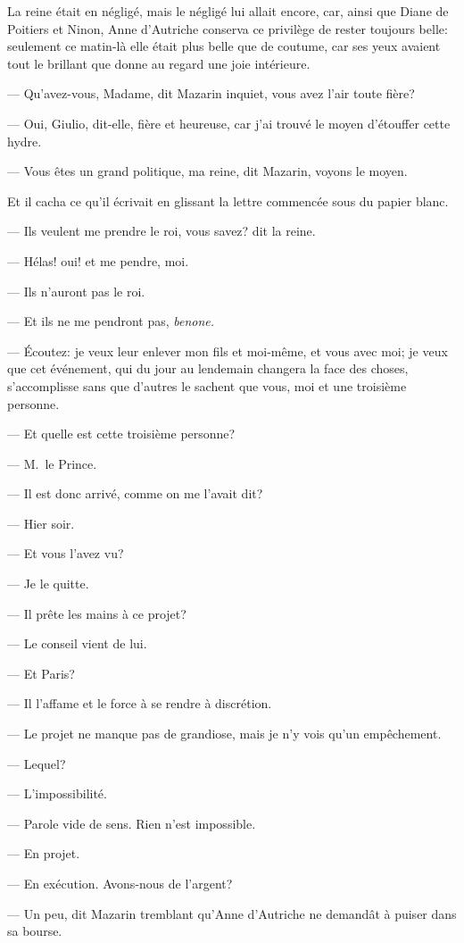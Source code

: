 La reine était en négligé, mais le négligé lui allait encore, car, ainsi que Diane de Poitiers et Ninon, Anne d'Autriche conserva ce privilège de rester toujours belle: seulement ce matin-là elle était plus belle que de coutume, car ses yeux avaient tout le brillant que donne au regard une joie intérieure.

— Qu'avez-vous, Madame, dit Mazarin inquiet, vous avez l'air toute fière?

— Oui, Giulio, dit-elle, fière et heureuse, car j'ai trouvé le moyen d'étouffer cette hydre.

— Vous êtes un grand politique, ma reine, dit Mazarin, voyons le moyen.

Et il cacha ce qu'il écrivait en glissant la lettre commencée sous du papier blanc.

— Ils veulent me prendre le roi, vous savez? dit la reine.

— Hélas! oui! et me pendre, moi.

— Ils n'auront pas le roi.

— Et ils ne me pendront pas, \textit{benone.}

— Écoutez: je veux leur enlever mon fils et moi-même, et vous avec moi; je veux que cet événement, qui du jour au lendemain changera la face des choses, s'accomplisse sans que d'autres le sachent que vous, moi et une troisième personne.

— Et quelle est cette troisième personne?

— M.~le Prince.

— Il est donc arrivé, comme on me l'avait dit?

— Hier soir.

— Et vous l'avez vu?

— Je le quitte.

— Il prête les mains à ce projet?

— Le conseil vient de lui.

— Et Paris?

— Il l'affame et le force à se rendre à discrétion.

— Le projet ne manque pas de grandiose, mais je n'y vois qu'un empêchement.

— Lequel?

— L'impossibilité.

— Parole vide de sens. Rien n'est impossible.

— En projet.

— En exécution. Avons-nous de l'argent?

— Un peu, dit Mazarin tremblant qu'Anne d'Autriche ne demandât à puiser dans sa bourse.

